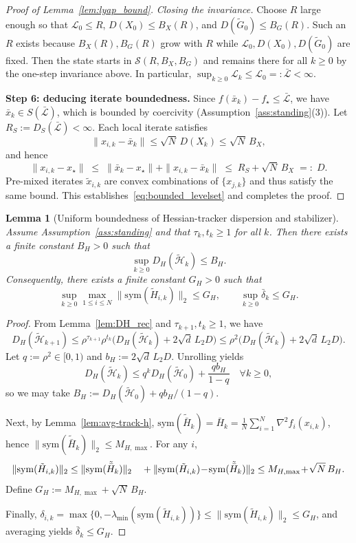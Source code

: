 \documentclass[10pt,twocolumn,letterpaper]{article}
\theoremstyle{compact}
\newtheorem{lemma}[theorem]{Lemma}
\theoremstyle{compactremark}
\begin{document}
\begin{proof}[Proof of Lemma~\ref{lem:lyap_bound}]
\emph{Closing the invariance.}
Choose $R$ large enough so that
$\mathcal L_0\le R$,
$D(X_0)\le B_X(R)$, and
$D(\tilde G_0)\le B_G(R)$.
Such an $R$ exists because $B_X(R),B_G(R)$ grow with $R$
while $\mathcal L_0,D(X_0),D(\tilde G_0)$ are fixed.
Then the state starts in $\mathcal S(R,B_X,B_G)$
and remains there for all $k\ge0$ by the one-step invariance above.
In particular, $\sup_{k\ge0}\mathcal L_k\le \mathcal L_0=:\bar{\mathcal L}<\infty$.

\vspace{1pt}
\noindent\textbf{Step 6: deducing iterate boundedness.}
Since $f(\bar x_k)-f_\star\le\bar{\mathcal L}$, we have
$\bar x_k\in S(\bar{\mathcal L})$,
which is bounded by coercivity (Assumption~\ref{ass:standing}(3)).
Let $R_S:=D_S(\bar{\mathcal L})<\infty$.
Each local iterate satisfies
\[
  \|x_{i,k}-\bar x_k\|\le\sqrt{N}\,D(X_k)\le\sqrt{N}\,B_X,
\]
and hence
\[
  \|x_{i,k}-x_\star\|
  \;\le\;
  \|\bar x_k-x_\star\|+\|x_{i,k}-\bar x_k\|
  \;\le\;
  R_S + \sqrt{N}\,B_X
  \;=:\; D.
\]
Pre-mixed iterates $\tilde x_{i,k}$ are convex combinations of
$\{x_{j,k}\}$ and thus satisfy the same bound.
This establishes~\eqref{eq:bounded_levelset} and completes the proof.
\end{proof}

\begin{lemma}[Uniform boundedness of Hessian-tracker dispersion and stabilizer]\label{lem:tilde_hess_bounded}
Assume Assumption~\ref{ass:standing} and that $\tau_k,t_k\ge 1$ for all $k$.
Then there exists a finite constant $B_H>0$ such that
\[
\sup_{k\ge 0} D_H(\tilde{\mathcal H}_k)\le B_H.
\]
Consequently, there exists a finite constant $G_H>0$ such that
\[
\sup_{k\ge 0}\max_{1\le i\le N}\big\|\mathrm{sym}(\tilde H_{i,k})\big\|_2 \le G_H,
\qquad
\sup_{k\ge 0}\bar\delta_k \le G_H.
\]
\end{lemma}

\begin{proof}
From Lemma~\ref{lem:DH_rec} and $\tau_{k+1},t_k\ge 1$, we have
\[
D_H(\tilde{\mathcal H}_{k+1})
\le \rho^{\tau_{k+1}}\rho^{t_k}\Big(D_H(\tilde{\mathcal H}_k)+2\sqrt d\,L_2D\Big)
\le \rho^2\Big(D_H(\tilde{\mathcal H}_k)+2\sqrt d\,L_2D\Big).
\]
Let $q:=\rho^2\in[0,1)$ and $b_H:=2\sqrt d\,L_2D$. Unrolling yields
\[
D_H(\tilde{\mathcal H}_k)\le q^k D_H(\tilde{\mathcal H}_0)+\frac{qb_H}{1-q}\quad \forall k\ge 0,
\]
so we may take $B_H:=D_H(\tilde{\mathcal H}_0)+qb_H/(1-q)$.

Next, by Lemma~\ref{lem:avg-track-h},
$\mathrm{sym}(\tilde{\bar H}_k)=\bar H_k=\frac1N\sum_{i=1}^N\nabla^2 f_i(x_{i,k})$,
hence $\|\mathrm{sym}(\tilde{\bar H}_k)\|_2\le M_{H,\max}$.
For any $i$,
\[
\|\mathrm{sym}(\tilde H_{i,k})\|_2
\le \|\mathrm{sym}(\tilde{\bar H}_k)\|_2\\
\quad + \|\mathrm{sym}(\tilde H_{i,k})\!-\!\mathrm{sym}(\tilde{\bar H}_k)\|_2
\le M_{H,\max}\!+\!\sqrt{N}\,B_H.
\]
Define $G_H:=M_{H,\max} + \sqrt{N}\,B_H$.

Finally, $\delta_{i,k}=\max\{0,-\lambda_{\min}(\mathrm{sym}(\tilde H_{i,k}))\}
\le \|\mathrm{sym}(\tilde H_{i,k})\|_2\le G_H$,
and averaging yields $\bar\delta_k\le G_H$.
\end{proof}
\end{document}
